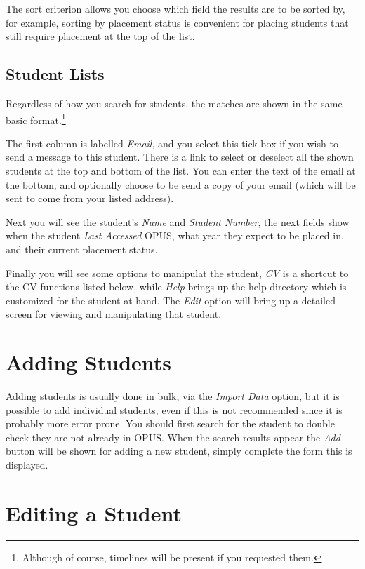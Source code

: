 \documentclass[12 pt]{book}
\begin{document}
The sort criterion allows you choose which field the results are to be sorted
by, for example, sorting by placement status is convenient for placing students
that still require placement at the top of the list.

\subsection{Student Lists}

Regardless of how you search for students, the matches are shown in the same
basic format.\footnote{Although of course, timelines will be present if you
requested them.}%

The first column is labelled \emph{Email}, and you select this tick box if you
wish to send a message to this student. There is a link to select or deselect
all the shown students at the top and bottom of the list. You can enter the
text of the email at the bottom, and optionally choose to be send a copy of
your email (which will be sent to come from your listed address).

Next you will see the student's \emph{Name} and \emph{Student Number}, the next
fields show when the student \emph{Last Accessed} OPUS, what year they expect
to be placed in, and their current placement status.

Finally you will see some options to manipulat the student, \emph{CV} is a
shortcut to the CV functions listed below, while \emph{Help} brings up the
help directory which is customized for the student at hand. The \emph{Edit}
option will bring up a detailed screen for viewing and manipulating that
student.

\section{Adding Students}

Adding students is usually done in bulk, via the \emph{Import Data} option,
but it is possible to add individual students, even if this is not recommended
since it is probably more error prone. You should first search for the student
to double check they are not already in OPUS. When the search results appear
the \emph{Add} button will be shown for adding a new student, simply complete
the form this is displayed.

\section{Editing a Student}
\end{document}
